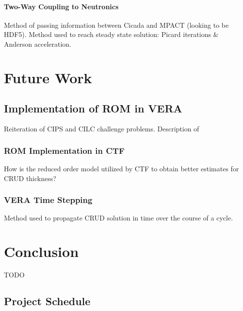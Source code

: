 \documentclass[10pt,a4paper]{report}
\begin{document}
\subsubsection{Two-Way Coupling to Neutronics}

Method of passing information between Cicada and MPACT (looking to be HDF5).  Method used to reach steady state solution:  Picard iterations \& Anderson acceleration.

\chapter{Future Work}

\section{Implementation of ROM in VERA}

Reiteration of CIPS and CILC challenge problems.  Description of 

\subsection{ROM Implementation in CTF}

How is the reduced order model utilized by CTF to obtain better estimates for CRUD thickness?

\subsection{VERA Time Stepping}

Method used to propagate CRUD solution in time over the course of a cycle.

\chapter{Conclusion}

TODO

\pagebreak
\section*{Project Schedule}
\end{document}
